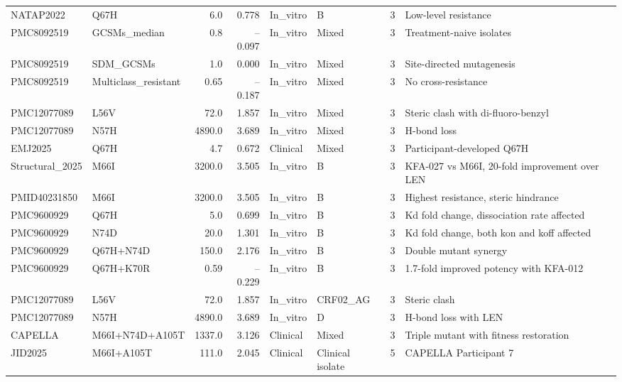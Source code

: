 {\begin{longtable}{p{1.3cm}p{1.8cm}rrp{1.0cm}p{1.5cm}cp{3.2cm}}
NATAP2022     & Q67H              & 6.0    & 0.778 & In\_vitro & B             & 3 & Low-level resistance \\
PMC8092519    & GCSMs\_median     & 0.8    & --0.097 & In\_vitro & Mixed         & 3 & Treatment-naive isolates \\
PMC8092519    & SDM\_GCSMs        & 1.0    & 0.000 & In\_vitro & Mixed         & 3 & Site-directed mutagenesis \\
PMC8092519    & Multiclass\_resistant & 0.65 & --0.187 & In\_vitro & Mixed       & 3 & No cross-resistance \\
PMC12077089   & L56V              & 72.0   & 1.857 & In\_vitro & Mixed         & 3 & Steric clash with di-fluoro-benzyl \\
PMC12077089   & N57H              & 4890.0 & 3.689 & In\_vitro & Mixed         & 3 & H-bond loss \\
EMJ2025       & Q67H              & 4.7    & 0.672 & Clinical & Mixed         & 3 & Participant-developed Q67H \\
Structural\_2025 & M66I           & 3200.0 & 3.505 & In\_vitro & B             & 3 & KFA-027 vs M66I, 20-fold improvement over LEN \\
PMID40231850  & M66I              & 3200.0 & 3.505 & In\_vitro & B             & 3 & Highest resistance, steric hindrance \\
PMC9600929    & Q67H              & 5.0    & 0.699 & In\_vitro & B             & 3 & Kd fold change, dissociation rate affected \\
PMC9600929    & N74D              & 20.0   & 1.301 & In\_vitro & B             & 3 & Kd fold change, both kon and koff affected \\
PMC9600929    & Q67H+N74D         & 150.0  & 2.176 & In\_vitro & B             & 3 & Double mutant synergy \\
PMC9600929    & Q67H+K70R         & 0.59   & --0.229 & In\_vitro & B           & 3 & 1.7-fold improved potency with KFA-012 \\
PMC12077089   & L56V              & 72.0   & 1.857 & In\_vitro & CRF02\_AG     & 3 & Steric clash \\
PMC12077089   & N57H              & 4890.0 & 3.689 & In\_vitro & D             & 3 & H-bond loss with LEN \\
CAPELLA       & M66I+N74D+A105T   & 1337.0 & 3.126 & Clinical & Mixed         & 3 & Triple mutant with fitness restoration \\
JID2025       & M66I+A105T        & 111.0  & 2.045 & Clinical & Clinical isolate & 5 & CAPELLA Participant 7 \\

\end{longtable}}
